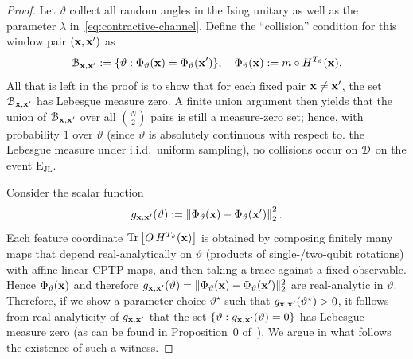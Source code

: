 \begin{proof}
    Let $\vartheta$ collect all random angles in the Ising unitary as well as the parameter $\lambda$ in~\cref{eq:contractive-channel}. Define the ``collision'' condition for this window pair $({\mathbf{x}}, {\mathbf{x}}')$ as
    \begin{equation*}
        {\mathcal{B}}_{{\mathbf{x}}, {\mathbf{x}}'}  := \{\vartheta: \Phi_{\vartheta}({\mathbf{x}}) = \Phi_{\vartheta}({\mathbf{x}}')\}, \quad \Phi_{\vartheta}({\mathbf{x}}) := m \circ H^{T_\vartheta}({\mathbf{x}}).
    \end{equation*}
    All that is left in the proof is to show that for each fixed pair ${\mathbf{x}} \neq {\mathbf{x}}'$, the set ${\mathcal{B}}_{{\mathbf{x}}, {\mathbf{x}}'}$ has Lebesgue measure zero. A finite union argument then yields that the union of ${\mathcal{B}}_{{\mathbf{x}}, {\mathbf{x}}'}$ over all $\binom{N}{2}$ pairs is still a measure-zero set; hence, with probability $1$ over $\vartheta$ (since $\vartheta$ is absolutely continuous with respect to. the Lebesgue measure under i.i.d.\ uniform sampling), no collisions occur on ${\mathcal{D}}$ on the event $\mathrm{E_{JL}}$.
    

    Consider the scalar function
    \begin{equation*}
        g_{{\mathbf{x}}, {\mathbf{x}}'}(\vartheta) := \left\lVert\Phi_{\vartheta}({\mathbf{x}}) - \Phi_{\vartheta}({\mathbf{x}}')\right\rVert_{2}^2.
    \end{equation*}
    Each feature coordinate $\operatorname{Tr}\left[O\,H^{T_\vartheta}({\mathbf{x}})\right]$ is obtained by composing finitely many maps that depend real-analytically on $\vartheta$ (products of single-/two-qubit rotations) with affine linear CPTP maps, and then taking a trace against a fixed observable. Hence $\Phi_{\vartheta}({\mathbf{x}})$ and therefore $g_{{\mathbf{x}},{\mathbf{x}}'}(\vartheta)=\|\Phi_{\vartheta}({\mathbf{x}})-\Phi_{\vartheta}({\mathbf{x}}')\|_2^2$ are real-analytic in $\vartheta$. Therefore, if we show a parameter choice $\vartheta^\star$ such that $g_{{\mathbf{x}}, {\mathbf{x}}'}(\vartheta^\star) > 0$, it follows from real-analyticity of $g_{{\mathbf{x}}, {\mathbf{x}}'}$ that the set $\{\vartheta: g_{{\mathbf{x}}, {\mathbf{x}}'}(\vartheta) = 0\}$ has Lebesgue measure zero (as can be found in Proposition~0 of~\cite{mityagin2015zeroset}). We argue in what follows the existence of such a witness.
    

\end{proof}
